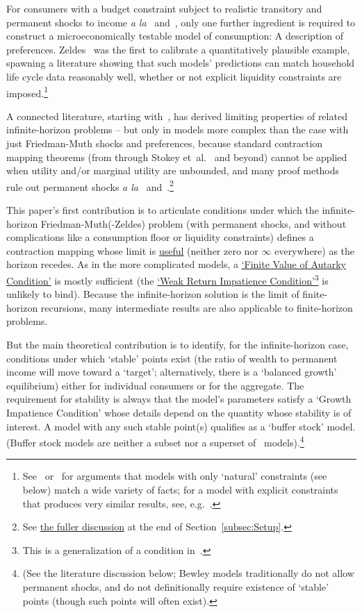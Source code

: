 \documentclass[BufferStockTheory]{subfiles}
\begin{document}
For consumers with a budget constraint subject to realistic transitory and permanent shocks to income \textit{a la}~\cite{friedmanATheory} and~\cite{muthOptimal}, only one further ingredient is required to construct a microeconomically testable model of consumption: A description of preferences.  Zeldes~\citeyearpar{zeldesStochastic} was the first to calibrate a quantitatively plausible example, spawning a literature showing that such models' predictions can match household life cycle data reasonably well, whether or not explicit liquidity constraints are imposed.\footnote{See~\cite{carrollBSLCPIH} or~\cite{gpLifeCycle} for arguments that models with only `natural' constraints (see below) match a wide variety of facts; for a model with explicit constraints that produces very similar results, see, e.g.~\cite{Cagetti}.}

A connected literature, starting with~\cite{bewleyPIH}, has derived limiting properties of related infinite-horizon problems -- but only in models more complex than the case with just Friedman-Muth shocks and preferences, because standard contraction mapping theorems (from \cite{bellmanDynamicProgramming} through Stokey et~al.~\citeyearpar{slpMethods} and beyond) cannot be applied when utility and/or marginal utility are unbounded, and many proof methods rule out permanent shocks \textit{a la}~\cite{friedmanATheory} and~\cite{muthOptimal}.\footnote{See \hyperlink{DiffFromLit}{the fuller discussion} at the end of Section~\ref{subsec:Setup}.}

This paper's first contribution is to articulate conditions under which the infinite-horizon Friedman-Muth(-Zeldes) problem (with permanent shocks, and without complications like a consumption floor or liquidity constraints) defines a contraction mapping whose limit is \hyperlink{useful}{useful} (neither zero nor $\infty$ everywhere) as the horizon recedes.  As in the more complicated models, a \hyperlink{FVAC}{`Finite Value of Autarky Condition'} is mostly sufficient (the \hyperlink{WRIC}{`Weak Return Impatience Condition'}\footnote{This is a generalization of a condition in~\cite{mstIncFluct}.} is unlikely to bind).  Because the infinite-horizon solution is the limit of finite-horizon recursions, many intermediate results are also applicable to finite-horizon problems.

But the main theoretical contribution is to identify, for the infinite-horizon case, conditions under which `stable' points exist (the ratio of wealth to permanent income will move toward a `target'; alternatively, there is a `balanced growth' equilibrium) either for individual consumers or for the aggregate.  The requirement for stability is always that the model's parameters satisfy a `Growth Impatience Condition' whose details depend on the quantity whose stability is of interest.  A model with any such stable point(s) qualifies as a `buffer stock' model.  (Buffer stock models are neither a subset nor a superset of~\cite{bewleyPIH} models).\footnote{(See the literature discussion below; Bewley models traditionally do not allow permanent shocks, and do not definitionally require existence of `stable' points (though such points will often exist).}
\end{document}
